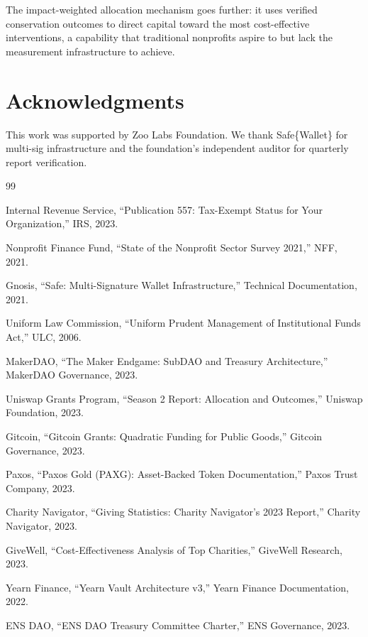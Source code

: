 \documentclass[11pt,letterpaper]{article}
\begin{document}
The impact-weighted allocation mechanism goes further: it uses verified conservation outcomes to direct capital toward the most cost-effective interventions, a capability that traditional nonprofits aspire to but lack the measurement infrastructure to achieve.

\section*{Acknowledgments}

This work was supported by Zoo Labs Foundation. We thank Safe\{Wallet\} for multi-sig infrastructure and the foundation's independent auditor for quarterly report verification.


\begin{thebibliography}{99}

Internal Revenue Service, ``Publication 557: Tax-Exempt Status for Your Organization,'' IRS, 2023.

Nonprofit Finance Fund, ``State of the Nonprofit Sector Survey 2021,'' NFF, 2021.

Gnosis, ``Safe: Multi-Signature Wallet Infrastructure,'' Technical Documentation, 2021.

Uniform Law Commission, ``Uniform Prudent Management of Institutional Funds Act,'' ULC, 2006.

MakerDAO, ``The Maker Endgame: SubDAO and Treasury Architecture,'' MakerDAO Governance, 2023.

Uniswap Grants Program, ``Season 2 Report: Allocation and Outcomes,'' Uniswap Foundation, 2023.

Gitcoin, ``Gitcoin Grants: Quadratic Funding for Public Goods,'' Gitcoin Governance, 2023.

Paxos, ``Paxos Gold (PAXG): Asset-Backed Token Documentation,'' Paxos Trust Company, 2023.

Charity Navigator, ``Giving Statistics: Charity Navigator's 2023 Report,'' Charity Navigator, 2023.

GiveWell, ``Cost-Effectiveness Analysis of Top Charities,'' GiveWell Research, 2023.

Yearn Finance, ``Yearn Vault Architecture v3,'' Yearn Finance Documentation, 2022.

ENS DAO, ``ENS DAO Treasury Committee Charter,'' ENS Governance, 2023.


\end{thebibliography}
\end{document}
